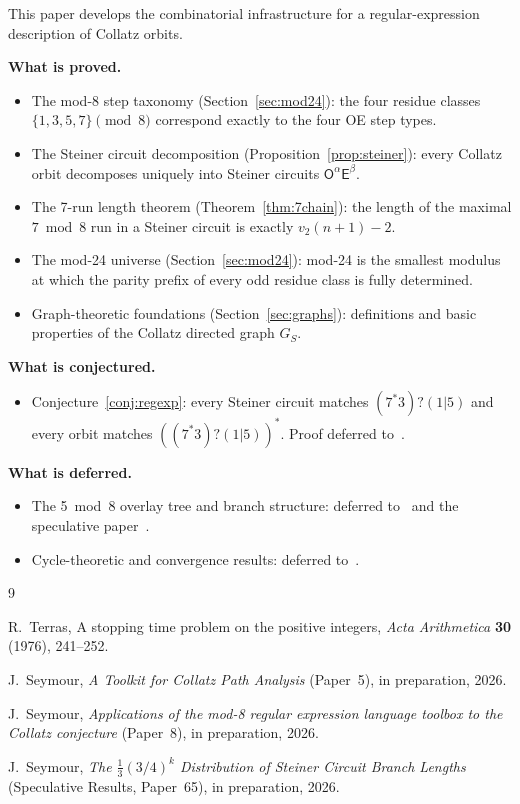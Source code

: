 \documentclass[11pt,a4paper]{article}
\theoremstyle{remark}
\theoremstyle{plain}
\begin{document}
This paper develops the combinatorial infrastructure for a regular-expression
description of Collatz orbits.

\medskip
\noindent\textbf{What is proved.}
\begin{itemize}
  \item The mod-8 step taxonomy (Section~\ref{sec:mod24}): the four residue classes
        $\{1,3,5,7\} \pmod{8}$ correspond exactly to the four OE step types.
  \item The Steiner circuit decomposition (Proposition~\ref{prop:steiner}):
        every Collatz orbit decomposes uniquely into Steiner circuits
        $\mathsf{O}^\alpha\mathsf{E}^\beta$.
  \item The 7-run length theorem (Theorem~\ref{thm:7chain}):
        the length of the maximal $7\bmod 8$ run in a Steiner circuit is
        exactly $v_2(n+1)-2$.
  \item The mod-24 universe (Section~\ref{sec:mod24}):
        mod-24 is the smallest modulus at which the parity prefix of every
        odd residue class is fully determined.
  \item Graph-theoretic foundations (Section~\ref{sec:graphs}):
        definitions and basic properties of the Collatz directed graph $G_S$.
\end{itemize}

\medskip
\noindent\textbf{What is conjectured.}
\begin{itemize}
  \item Conjecture~\ref{conj:regexp}: every Steiner circuit matches $(7^*3)?(1|5)$
        and every orbit matches $((7^*3)?(1|5))^*$.
        Proof deferred to~\cite{paper5}.
\end{itemize}

\medskip
\noindent\textbf{What is deferred.}
\begin{itemize}
  \item The 5~mod~8 overlay tree and branch structure: deferred to~\cite{paper5}
        and the speculative paper~\cite{paper65}.
  \item Cycle-theoretic and convergence results: deferred to~\cite{paper8}.
\end{itemize}

\begin{thebibliography}{9}

R.~Terras,
A stopping time problem on the positive integers,
\emph{Acta Arithmetica} \textbf{30} (1976), 241--252.

J.~Seymour,
\emph{A Toolkit for Collatz Path Analysis} (Paper~5),
in preparation, 2026.

J.~Seymour,
\emph{Applications of the mod-8 regular expression language toolbox to the Collatz conjecture} (Paper~8),
in preparation, 2026.

J.~Seymour,
\emph{The $\frac{1}{3}(3/4)^k$ Distribution of Steiner Circuit Branch Lengths} (Speculative Results, Paper~65),
in preparation, 2026.

\end{thebibliography}
\end{document}
